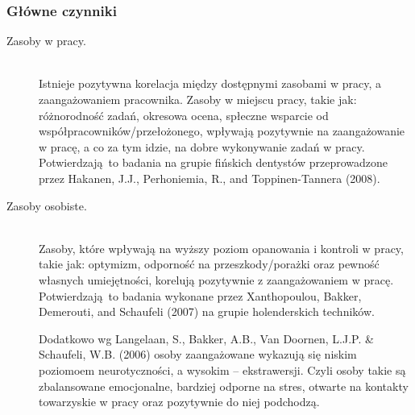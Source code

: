 \subsubsection{Główne czynniki}
\begin{description}
\item[Zasoby w pracy.] \hfill \\
Istnieje pozytywna korelacja między dostępnymi zasobami w pracy, a zaangażowaniem pracownika. Zasoby w miejscu pracy, takie jak: różnorodność zadań, okresowa ocena, spłeczne wsparcie od współpracowników/przełożonego, wpływają pozytywnie na zaangażowanie w pracę, a co za tym idzie, na dobre wykonywanie zadań w pracy. Potwierdzają to badania na grupie fińskich dentystów przeprowadzone przez Hakanen, J.J., Perhoniemia, R., and Toppinen-Tannera (2008).
\item[Zasoby osobiste.] \hfill \\
Zasoby, które wpływają na wyższy poziom opanowania i kontroli w pracy, takie jak: optymizm, odporność na przeszkody/porażki oraz pewność własnych umiejętności, korelują pozytywnie z zaangażowaniem w pracę. Potwierdzają to badania wykonane przez Xanthopoulou, Bakker, Demerouti, and Schaufeli (2007) na grupie holenderskich techników.

Dodatkowo wg Langelaan, S., Bakker, A.B., Van Doornen, L.J.P. \& Schaufeli, W.B. (2006) osoby zaangażowane wykazują się niskim poziomoem neurotyczności, a wysokim -- ekstrawersji. Czyli osoby takie są zbalansowane emocjonalne, bardziej odporne na stres, otwarte na kontakty towarzyskie w pracy oraz pozytywnie do niej podchodzą. 

\end{description}


